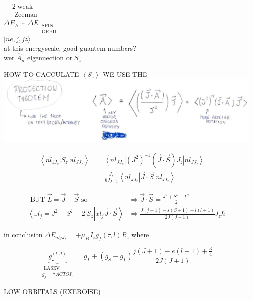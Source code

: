 \documentclass[10pt]{article}
\begin{document}
$\begin{aligned} & 2 \text { weak } \\ & \text { Zeeman }\end{aligned}$\\
$\Delta E_{B} \backsim \Delta E_{\substack{\text { SPIN } \\ \text { ORBIT }}}$\\
$|n e, j, j z\rangle$\\
at this energyscale, good guantem numbers?\\
wer $\hat{A}_{n}$ elgenuection or $S_{z}$

HOW TO CACCULATE $\left\langle S_{z}\right\rangle$ WE USE THE\\
\includegraphics[max width=\textwidth, center]{2025_10_16_e34e240cf6beac2f9e0dg-7(2)}

$$
\begin{aligned}
\left\langle n l_{J J_{z}}\right| S_{z}\left|n l_{J J_{z}}\right\rangle & =\left\langle n l_{J J_{z}}\right|\left(J^{2}\right)^{-1}(\vec{J} \cdot \vec{S}) J_{z}\left|n l_{J J_{z}}\right\rangle= \\
& =\frac{J_{z}}{\hbar J_{J+1}}\left\langle n l_{J J_{z}}\right| \vec{J} \cdot \vec{S}\left|n l_{J J_{z}}\right\rangle
\end{aligned}
$$

$$
\begin{array}{ll}
\text { BUT } \vec{L}=\vec{J}-\vec{S} \text { so } & \Rightarrow \vec{J} \cdot \vec{S}=\frac{J^{2}+S^{2}-L^{2}}{2} \\
\left\langle x l_{j}=J^{2}+S^{2}-2\right| S_{z}\left|x l_{j} \vec{J} \cdot \vec{S}\right\rangle & \Rightarrow \frac{J(j+1)+s(S+1)-l(l+1)}{2 J(J+1)} J_{z} \hbar
\end{array}
$$

in conclusion $\Delta E_{n l j J_{z}}=+\mu_{B} J_{z} g_{f}(\tau, l) B_{z}$ where

$$
\underbrace{g_{J}^{(l, J)}}_{\substack{\text { LASEV } \\ g_{j}=\forall A C T O R}}=g_{L}+\left(g_{S}-g_{L}\right) \frac{j(J+1)-e(l+1)+\frac{3}{4}}{2 J(J+1)}
$$

LOW ORBITALS (EXEROISE)
\end{document}
